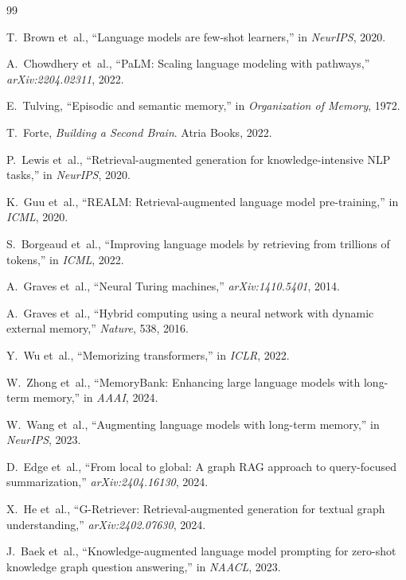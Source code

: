 \documentclass[conference]{IEEEtran}
\begin{document}

\begin{thebibliography}{99}

T.~Brown et~al., ``Language models are few-shot learners,'' in \emph{NeurIPS}, 2020.

A.~Chowdhery et~al., ``PaLM: Scaling language modeling with pathways,'' \emph{arXiv:2204.02311}, 2022.

E.~Tulving, ``Episodic and semantic memory,'' in \emph{Organization of Memory}, 1972.

T.~Forte, \emph{Building a Second Brain}. Atria Books, 2022.

P.~Lewis et~al., ``Retrieval-augmented generation for knowledge-intensive NLP tasks,'' in \emph{NeurIPS}, 2020.

K.~Guu et~al., ``REALM: Retrieval-augmented language model pre-training,'' in \emph{ICML}, 2020.

S.~Borgeaud et~al., ``Improving language models by retrieving from trillions of tokens,'' in \emph{ICML}, 2022.

A.~Graves et~al., ``Neural Turing machines,'' \emph{arXiv:1410.5401}, 2014.

A.~Graves et~al., ``Hybrid computing using a neural network with dynamic external memory,'' \emph{Nature}, 538, 2016.

Y.~Wu et~al., ``Memorizing transformers,'' in \emph{ICLR}, 2022.

W.~Zhong et~al., ``MemoryBank: Enhancing large language models with long-term memory,'' in \emph{AAAI}, 2024.

W.~Wang et~al., ``Augmenting language models with long-term memory,'' in \emph{NeurIPS}, 2023.

D.~Edge et~al., ``From local to global: A graph RAG approach to query-focused summarization,'' \emph{arXiv:2404.16130}, 2024.

X.~He et~al., ``G-Retriever: Retrieval-augmented generation for textual graph understanding,'' \emph{arXiv:2402.07630}, 2024.

J.~Baek et~al., ``Knowledge-augmented language model prompting for zero-shot knowledge graph question answering,'' in \emph{NAACL}, 2023.


\end{thebibliography}
\end{document}
